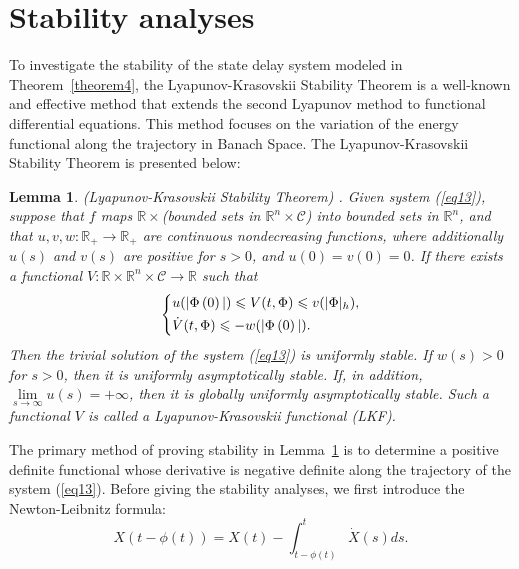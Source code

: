 \documentclass[a4paper]{cas-sc}
\newtheorem{lemma}[theorem]{Lemma}
\begin{document}
\section{Stability analyses}
\label{Section 4}

To investigate the stability of the state delay system modeled in Theorem~\ref{theorem4}, the Lyapunov-Krasovskii Stability Theorem is a well-known and effective method that extends the second Lyapunov method to functional differential equations. This method focuses on the variation of the energy functional along the trajectory in Banach Space. The Lyapunov-Krasovskii Stability Theorem is presented below:
\begin{lemma}
  \label{lemma5}
  (Lyapunov-Krasovskii Stability Theorem) \citep{Gu2009}. Given system (\ref{eq13}), suppose that $f$ maps $\mathbb{R} \times  $(bounded sets in ${\mathbb{R}^n} \times \mathcal{C} $) into bounded sets in ${\mathbb{R}^n} $, and that $u,v,w:{\mathbb{R}_ + } \to {\mathbb{R}_ + } $ are continuous nondecreasing functions, where additionally $u(s) $ and $v(s) $ are positive for $s > 0 $, and $u(0) = v(0) = 0 $. If there exists a functional $V:\mathbb{R} \times {\mathbb{R}^n} \times \mathcal{C} \to \mathbb{R} $ such that
  \begin{equation}
    \left\{ \begin{gathered}
      u(|\Phi \left( 0 \right)|) \leqslant V(t,\Phi ) \leqslant v(|\Phi {|_h}) \hfill, \\
      \dot V(t,\Phi ) \leqslant  - w(|\Phi \left( 0 \right)|). \hfill \\
    \end{gathered}  \right.
    \label{eq15}
  \end{equation}
  Then the trivial solution of the system (\ref{eq13}) is uniformly stable. If $w(s) > 0 $ for $s > 0 $, then it is uniformly asymptotically stable. If, in addition, $\mathop {\lim }\limits_{s \to \infty } u(s) =  + \infty  $, then it is globally uniformly asymptotically stable. Such a functional $V $ is called a Lyapunov-Krasovskii functional (LKF).
\end{lemma}

The primary method of proving stability in Lemma~\ref{lemma5} is to determine a positive definite functional whose derivative is negative definite along the trajectory of the system (\ref{eq13}). 
Before giving the stability analyses, we first introduce the Newton-Leibnitz formula:
\begin{equation}
X(t-\phi(t))=X(t)-\int_{t-\phi(t)}^t\dot{X}(s)ds. 
\label{eq16}
\end{equation}
\end{document}
